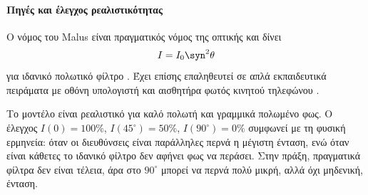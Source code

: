 \paragraph{Πηγές και έλεγχος ρεαλιστικότητας}
Ο νόμος του Malus είναι πραγματικός νόμος της οπτικής και δίνει
\[
  I=I_0\syn^2\theta
\]
για ιδανικό πολωτικό φίλτρο \cite{malusLawPolarizer}. Έχει επίσης
επαληθευτεί σε απλά εκπαιδευτικά πειράματα με οθόνη υπολογιστή και
αισθητήρα φωτός κινητού τηλεφώνου
\cite{monteiro2016malusSmartphone}.

Το μοντέλο είναι ρεαλιστικό για καλό πολωτή και γραμμικά πολωμένο φως.
Ο έλεγχος \(I(0)=100\%\), \(I(45^\circ)=50\%\),
\(I(90^\circ)=0\%\) συμφωνεί με τη φυσική ερμηνεία: όταν οι διευθύνσεις
είναι παράλληλες περνά η μέγιστη ένταση, ενώ όταν είναι κάθετες το
ιδανικό φίλτρο δεν αφήνει φως να περάσει. Στην πράξη, πραγματικά
φίλτρα δεν είναι τέλεια, άρα στο \(90^\circ\) μπορεί να περνά πολύ
μικρή, αλλά όχι μηδενική, ένταση.

